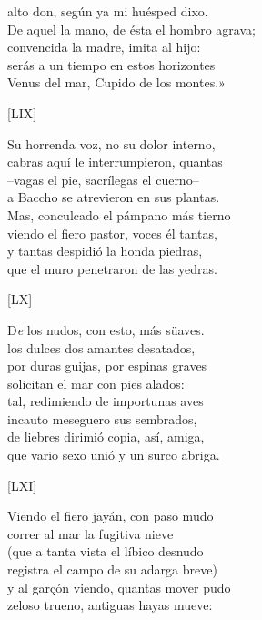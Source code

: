 \documentclass[11pt,a4paper,twoside]{article}
\begin{document}
alto don, según ya mi huésped dixo.\\
De aquel la mano, de ésta el hombro agrava;\\
convencida la madre, imita al hijo:\\
serás a un tiempo en estos horizontes\\
Venus del mar, Cupido de los montes.»\par\pend
%
\begin{center}
	[LIX]
\end{center}\pstart
Su horrenda voz, no su dolor interno,\\
cabras aquí le interrumpieron, quantas\\
--vagas el pie, sacrílegas el cuerno--\\
a Baccho se atrevieron en sus plantas.\\
Mas, conculcado el pámpano más tierno\\
viendo el fiero pastor, voces él tantas,\\
y tantas despidió la honda piedras,\\
que el muro penetraron de las yedras.\par\pend
%
\begin{center}
	[LX]
\end{center}\pstart
D\emph{e} los nudos, con esto, más süaves.\\
los dulces dos amantes desatados,\\
por duras guijas, por espinas graves\\
solicitan el mar con pies alados:\\
tal, redimiendo de importunas aves\\
incauto meseguero sus sembrados,\\
de liebres dirimió copia, así, amiga,\\
que vario sexo unió y un surco abriga.\par\pend
%
\begin{center}
	[LXI]
\end{center}\pstart
Viendo el fiero jayán, con paso mudo\\
correr al mar la fugitiva nieve\\
(que a tanta vista el líbico desnudo\\
registra el campo de su adarga breve)\\
y al garçón viendo, quantas mover pudo\\
zeloso trueno, antiguas hayas mueve:\\
\end{document}
